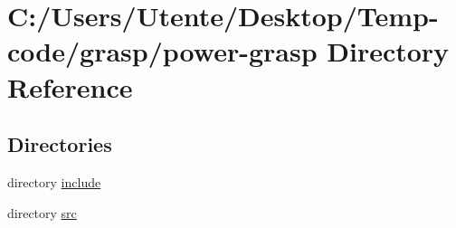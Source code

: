 \section{C\+:/\+Users/\+Utente/\+Desktop/\+Temp-\/code/grasp/power-\/grasp Directory Reference}
\label{dir_34352b08797597fadd43d34d7bdad671}
\subsection*{Directories}
\begin{DoxyCompactItemize}
\item 
directory \hyperlink{dir_efb7eddc169b66b1d309372c1fedb5d2}{include}
\item 
directory \hyperlink{dir_bb53a4e1b5ec10e573c3549b66ff0295}{src}
\end{DoxyCompactItemize}
